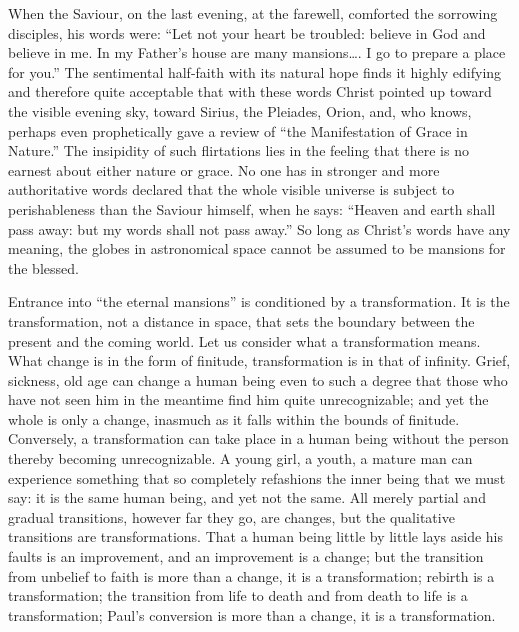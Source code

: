 \documentclass[12pt,a4paper,openany]{book}
\newcommand{\opage}[1]{\marginnote{\footnotesize\textit{[#1]}}}
\begin{document}
When the Saviour, on the last evening, at the farewell, comforted the sorrowing disciples, his words were: ``Let not
your heart be troubled: believe in God and believe in me. In my Father's house are many mansions\dots{}. I go to
prepare a place for you.'' The sentimental half-faith with its natural hope finds it highly edifying and therefore
quite acceptable that with these words Christ pointed up toward the visible evening sky, toward Sirius, the Pleiades,
Orion, and, who knows, perhaps even prophetically gave a review of ``the Manifestation of Grace in Nature.'' The
insipidity of such flirtations lies in the feeling that there is no earnest about either nature or grace. No one has
in stronger and more authoritative words
\setcounter{footnote}{0}%
\opage{96}declared that the whole visible universe is subject to perishableness than the Saviour himself, when he %
says: ``Heaven and earth shall pass away: but my words shall not pass away.'' So long as Christ's words have any
meaning, the globes in astronomical space cannot be assumed to be mansions for the blessed.

Entrance into ``the eternal mansions'' is conditioned by a transformation. It is the transformation, not a distance in
space, that sets the boundary between the present and the coming world. Let us consider what a transformation means.
What change is in the form of finitude, transformation is in that of infinity. Grief, sickness, old age can change a
human being even to such a degree that those who have not seen him in the meantime find him quite unrecognizable; and
yet the whole is only a change, inasmuch as it falls within the bounds of finitude. Conversely, a transformation can
take place in a human being without the person thereby becoming unrecognizable. A young girl, a youth, a mature man
can experience something that so completely refashions the inner being that we must say: it is the same human being,
and yet not the same. All merely partial and gradual transitions, however far they go, are changes, but the
qualitative transitions are transformations. That a human being little by little lays aside his faults is an
improvement, and an improvement is a change; but the transition from unbelief to faith is more than a change, it is a
transformation; rebirth is a transformation; the transition from life to death and from death to life is a
transformation; Paul's conversion is more than a change, it is a transformation.
\end{document}
